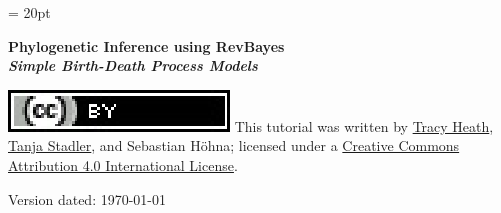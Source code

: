 \documentclass[11pt]{article}
\begin{document}
\renewcommand{\headrulewidth}{0.5pt}
\headsep = 20pt
\lhead{ }

\thispagestyle{plain}
\begin{center}

\textbf{\LARGE Phylogenetic Inference using RevBayes}\\\vspace{2mm}
\textbf{\it{\Large Simple Birth-Death Process Models}}\\\vspace{2mm}
\end{center}



\href{http://creativecommons.org/licenses/by/4.0/}{\includegraphics[scale=0.8]{../shared_figures/ccby.eps}} This tutorial was written by \href{http://phylo.bio.ku.edu/content/tracy-heath}{Tracy Heath}, \href{http://www.bsse.ethz.ch/cevo}{Tanja Stadler}, and Sebastian H\"{o}hna; licensed under a \href{http://creativecommons.org/licenses/by/4.0/}{Creative Commons Attribution 4.0 International License}. 



Version dated: \today



\printbibliography[heading=relevref]
\end{document}
